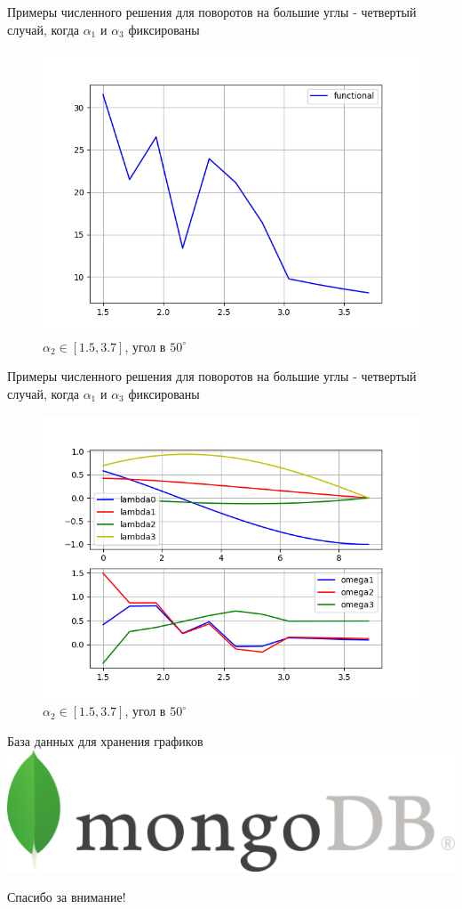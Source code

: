 \documentclass[10pt,utf8,presentation,notheorems,xcolor=dvipsnames,compress]{beamer}
\begin{document}
\begin{frame}{Примеры численного решения для поворотов на большие углы - четвертый случай, когда $\alpha_1$ и $\alpha_3$ фиксированы}
\begin{figure}[H]
\center\includegraphics[scale=0.5]{fig/functional_alpha2_1_5-3_7_50.png}
\caption{$\alpha_2 \in [1.5, 3.7]$, угол в $50^{\circ}$}
\end{figure}
\end{frame}

\begin{frame}{Примеры численного решения для поворотов на большие углы - четвертый случай, когда $\alpha_1$ и $\alpha_3$ фиксированы}
\begin{figure}[H]
\center\includegraphics[scale=0.5]{fig/ivp_and_control_alpha2_1_5-3_7_50.png}
\caption{$\alpha_2 \in [1.5, 3.7]$, угол в $50^{\circ}$}
\end{figure}
\end{frame}

\begin{frame}{База данных для хранения графиков}
\center\includegraphics[scale=0.5]{fig/MongoDB-Logo.png}
\end{frame}

\begin{frame}[standout]
Спасибо за внимание!
\end{frame}
\end{document}
